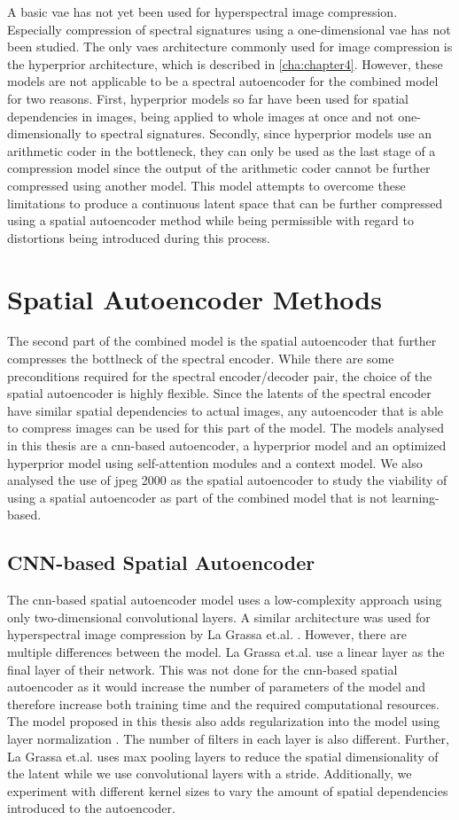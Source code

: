 A basic \ac{vae} has not yet been used for hyperspectral image compression. Especially compression of spectral signatures using a one-dimensional \ac{vae} has not been studied. The only \acp{vae} architecture commonly used for image compression is the hyperprior architecture, which is described in \autoref{cha:chapter4}. However, these models are not applicable to be a spectral autoencoder for the combined model for two reasons. First, hyperprior models so far have been used for spatial dependencies in images, being applied to whole images at once and not one-dimensionally to spectral signatures. Secondly, since hyperprior models use an arithmetic coder in the bottleneck, they can only be used as the last stage of a compression model since the output of the arithmetic coder cannot be further compressed using another model. This model attempts to overcome these limitations to produce a continuous latent space that can be further compressed using a spatial autoencoder method while being permissible with regard to distortions being introduced during this process.
\section{Spatial Autoencoder Methods\label{sec:spatialae}}
The second part of the combined model is the spatial autoencoder that further compresses the bottlneck of the spectral encoder. While there are some preconditions required for the spectral encoder/decoder pair, the choice of the spatial autoencoder is highly flexible. Since the latents of the spectral encoder have similar spatial dependencies to actual images, any autoencoder that is able to compress images can be used for this part of the model. The models analysed in this thesis are a \ac{cnn}-based autoencoder, a hyperprior model and an optimized hyperprior model using self-attention modules and a context model. We also analysed the use of \ac{jpeg} 2000 as the spatial autoencoder to study the viability of using a spatial autoencoder as part of the combined model that is not learning-based.
\subsection{CNN-based Spatial Autoencoder}
The \ac{cnn}-based spatial autoencoder model uses a low-complexity approach using only two-dimensional convolutional layers. A similar architecture was used for hyperspectral image compression by La Grassa et.al. \citep{la_grassa_hyperspectral_2022}. However, there are multiple differences between the model. La Grassa et.al. use a linear layer as the final layer of their network. This was not done for the \ac{cnn}-based spatial autoencoder as it would increase the number of parameters of the model and therefore increase both training time and the required computational resources. The model proposed in this thesis also adds regularization into the model using layer normalization \citep{ba_layer_2016}. The number of filters in each layer is also different. Further, La Grassa et.al. uses max pooling layers to reduce the spatial dimensionality of the latent while we use convolutional layers with a stride. Additionally, we experiment with different kernel sizes to vary the amount of spatial dependencies introduced to the autoencoder.

